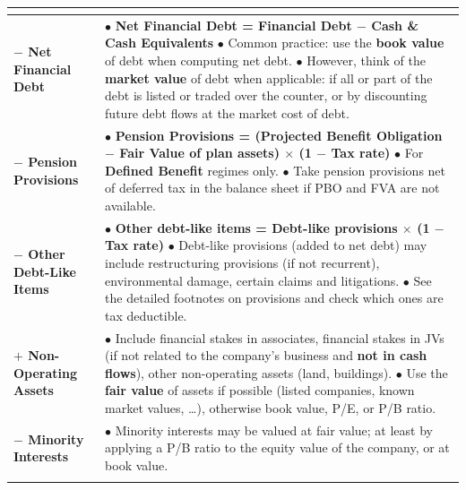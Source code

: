\begin{center}
\small
\renewcommand{\arraystretch}{1.25}
\begin{tabularx}{\textwidth}{@{}>{\bfseries}p{2.7cm}X@{}}
\toprule
\multicolumn{2}{c}{\textbf{ENTERPRISE VALUE}}\\
\midrule
$-$ Net Financial Debt &
$\bullet$ \textbf{Net Financial Debt = Financial Debt $-$ Cash \& Cash Equivalents}\newline
$\bullet$ Common practice: use the \textbf{book value} of debt when computing net debt.\newline
$\bullet$ However, think of the \textbf{market value} of debt when applicable: if all or part of the debt is listed or traded over the counter, or by discounting future debt flows at the market cost of debt.\\
\midrule
$-$ Pension Provisions &
$\bullet$ \textbf{Pension Provisions = (Projected Benefit Obligation $-$ Fair Value of plan assets) $\times$ (1 $-$ Tax rate)}\newline
$\bullet$ For \textbf{Defined Benefit} regimes only.\newline
$\bullet$ Take pension provisions net of deferred tax in the balance sheet if PBO and FVA are not available.\\
\midrule
$-$ Other Debt-Like Items &
$\bullet$ \textbf{Other debt-like items = Debt-like provisions $\times$ (1 $-$ Tax rate)}\newline
$\bullet$ Debt-like provisions (added to net debt) may include restructuring provisions (if not recurrent), environmental damage, certain claims and litigations.\newline
$\bullet$ See the detailed footnotes on provisions and check which ones are tax deductible.\\
\midrule
$+$ Non-Operating Assets &
$\bullet$ Include financial stakes in associates, financial stakes in JVs (if not related to the company's business and \textbf{not in cash flows}), other non-operating assets (land, buildings).\newline
$\bullet$ Use the \textbf{fair value} of assets if possible (listed companies, known market values, \dots), otherwise book value, P/E, or P/B ratio.\\
\midrule
$-$ Minority Interests &
$\bullet$ Minority interests may be valued at fair value; at least by applying a P/B ratio to the equity value of the company, or at book value.\\
\midrule
\multicolumn{2}{c}{\textbf{EQUITY VALUE}}\\
\bottomrule
\end{tabularx}
\end{center}

